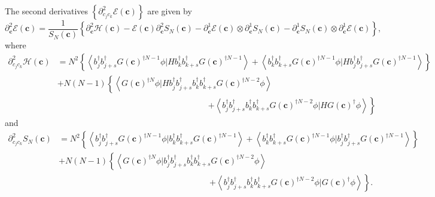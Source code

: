 \documentclass[aps,preprint]{revtex4}%
\begin{document}
The second derivatives $\left\{  \partial_{c_{j}c_{k}}^{2}\mathcal{E}\left(
\mathbf{c}\right)  \right\}  $ are given by
\begin{equation}
\partial_{\mathbf{c}}^{2}\mathcal{E}\left(  \mathbf{c}\right)  =\frac{1}%
{S_{N}\left(  \mathbf{c}\right)  }\left\{  \partial_{\mathbf{c}}%
^{2}\mathcal{H}\left(  \mathbf{c}\right)  -\mathcal{E}\left(  \mathbf{c}%
\right)  \partial_{\mathbf{c}}^{2}S_{N}\left(  \mathbf{c}\right)
-\partial_{\mathbf{c}}^{1}\mathcal{E}\left(  \mathbf{c}\right)  \otimes
\partial_{\mathbf{c}}^{1}S_{N}\left(  \mathbf{c}\right)  -\partial
_{\mathbf{c}}^{1}S_{N}\left(  \mathbf{c}\right)  \otimes\partial_{\mathbf{c}%
}^{1}\mathcal{E}\left(  \mathbf{c}\right)  \right\}  , \label{Hess}%
\end{equation}
where
\begin{align}
\partial_{c_{j}c_{k}}^{2}\mathcal{H}\left(  \mathbf{c}\right)   &
=N^{2}\left\{  \left\langle b_{j}^{\dagger}b_{j+s}^{\dagger}G\left(
\mathbf{c}\right)  ^{\dagger N-1}\phi|Hb_{k}^{\dagger}b_{k+s}^{\dagger
}G\left(  \mathbf{c}\right)  ^{\dagger N-1}\right\rangle +\left\langle
b_{k}^{\dagger}b_{k+s}^{\dagger}G\left(  \mathbf{c}\right)  ^{\dagger N-1}%
\phi|Hb_{j}^{\dagger}b_{j+s}^{\dagger}G\left(  \mathbf{c}\right)  ^{\dagger
N-1}\right\rangle \right\} \nonumber\\
&  +N\left(  N-1\right)  \left\{  \left\langle G\left(  \mathbf{c}\right)
^{\dagger N}\phi|Hb_{j}^{\dagger}b_{j+s}^{\dagger}b_{k}^{\dagger}%
b_{k+s}^{\dagger}G\left(  \mathbf{c}\right)  ^{\dagger N-2}\phi\right\rangle
\right. \nonumber\\
&  \qquad\qquad\qquad\qquad\qquad\qquad\qquad\qquad\qquad\left.  +\left\langle
b_{j}^{\dagger}b_{j+s}^{\dagger}b_{k}^{\dagger}b_{k+s}^{\dagger}G\left(
\mathbf{c}\right)  ^{\dagger N-2}\phi|HG\left(  \mathbf{c}\right)  ^{\dagger
}\phi\right\rangle \right\}
\end{align}
and
\begin{align}
\partial_{c_{j}c_{k}}^{2}S_{N}\left(  \mathbf{c}\right)   &  =N^{2}\left\{
\left\langle b_{j}^{\dagger}b_{j+s}^{\dagger}G\left(  \mathbf{c}\right)
^{\dagger N-1}\phi|b_{k}^{\dagger}b_{k+s}^{\dagger}G\left(  \mathbf{c}\right)
^{\dagger N-1}\right\rangle +\left\langle b_{k}^{\dagger}b_{k+s}^{\dagger
}G\left(  \mathbf{c}\right)  ^{\dagger N-1}\phi|b_{j}^{\dagger}b_{j+s}%
^{\dagger}G\left(  \mathbf{c}\right)  ^{\dagger N-1}\right\rangle \right\}
\nonumber\\
&  +N\left(  N-1\right)  \left\{  \left\langle G\left(  \mathbf{c}\right)
^{\dagger N}\phi|b_{j}^{\dagger}b_{j+s}^{\dagger}b_{k}^{\dagger}%
b_{k+s}^{\dagger}G\left(  \mathbf{c}\right)  ^{\dagger N-2}\phi\right\rangle
\right. \nonumber\\
&  \qquad\qquad\qquad\qquad\qquad\qquad\qquad\qquad\qquad\left.  +\left\langle
b_{j}^{\dagger}b_{j+s}^{\dagger}b_{k}^{\dagger}b_{k+s}^{\dagger}G\left(
\mathbf{c}\right)  ^{\dagger N-2}\phi|G\left(  \mathbf{c}\right)  ^{\dagger
}\phi\right\rangle \right\}  .
\end{align}
\end{document}
